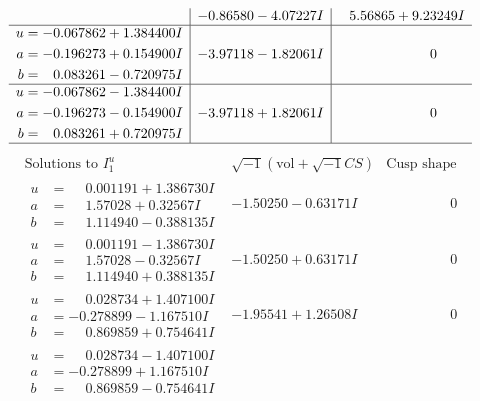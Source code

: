 \documentclass[1p]{elsarticle_modified}
\theoremstyle{definition}
\newcommand{\I}{\sqrt{-1}}
\begin{document}
$$\begin{array}{c|c|c}
 & -0.86580 - 4.07227 I & \phantom{-}5.56865 + 9.23249 I \\ \hline\begin{aligned}
u &= -0.067862 + 1.384400 I \\
a &= -0.196273 + 0.154900 I \\
b &= \phantom{-}0.083261 - 0.720975 I\end{aligned}
 & -3.97118 - 1.82061 I & \phantom{-0.000000 } 0 \\ \hline\begin{aligned}
u &= -0.067862 - 1.384400 I \\
a &= -0.196273 - 0.154900 I \\
b &= \phantom{-}0.083261 + 0.720975 I\end{aligned}
 & -3.97118 + 1.82061 I & \phantom{-0.000000 } 0\\
 \hline 
 \end{array}$$\newpage$$\begin{array}{c|c|c}  
\text{Solutions to }I^u_{1}& \I (\text{vol} + \sqrt{-1}CS) & \text{Cusp shape}\\
 \hline 
\begin{aligned}
u &= \phantom{-}0.001191 + 1.386730 I \\
a &= \phantom{-}1.57028 + 0.32567 I \\
b &= \phantom{-}1.114940 - 0.388135 I\end{aligned}
 & -1.50250 - 0.63171 I & \phantom{-0.000000 } 0 \\ \hline\begin{aligned}
u &= \phantom{-}0.001191 - 1.386730 I \\
a &= \phantom{-}1.57028 - 0.32567 I \\
b &= \phantom{-}1.114940 + 0.388135 I\end{aligned}
 & -1.50250 + 0.63171 I & \phantom{-0.000000 } 0 \\ \hline\begin{aligned}
u &= \phantom{-}0.028734 + 1.407100 I \\
a &= -0.278899 - 1.167510 I \\
b &= \phantom{-}0.869859 + 0.754641 I\end{aligned}
 & -1.95541 + 1.26508 I & \phantom{-0.000000 } 0 \\ \hline\begin{aligned}
u &= \phantom{-}0.028734 - 1.407100 I \\
a &= -0.278899 + 1.167510 I \\
b &= \phantom{-}0.869859 - 0.754641 I\end{aligned}

\end{array}$$
\end{document}
